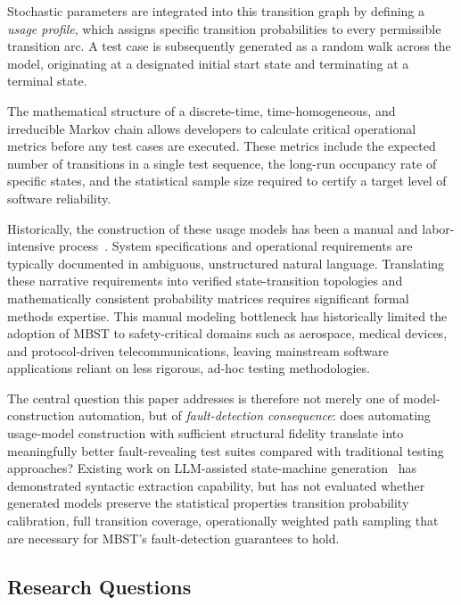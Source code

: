 Stochastic parameters are integrated into this transition graph by defining a \emph{usage profile}, which assigns specific transition probabilities to every permissible transition arc. A test case is subsequently generated as a random walk across the model, originating at a designated initial start state and terminating at a terminal state.

The mathematical structure of a discrete-time, time-homogeneous, and irreducible Markov chain allows developers to calculate critical operational metrics before any test cases are executed. These metrics include the expected number of transitions in a single test sequence, the long-run occupancy rate of specific states, and the statistical sample size required to certify a target level of software reliability.

Historically, the construction of these usage models has been a manual and labor-intensive process~\cite{llm_state_machine_frameworks}. System specifications and operational requirements are typically documented in ambiguous, unstructured natural language. Translating these narrative requirements into verified state-transition topologies and mathematically consistent probability matrices requires significant formal methods expertise. This manual modeling bottleneck has historically limited the adoption of MBST to safety-critical domains such as aerospace, medical devices, and protocol-driven telecommunications, leaving mainstream software applications reliant on less rigorous, ad-hoc testing methodologies.

The central question this paper addresses is therefore not merely one of model-construction automation, but of \emph{fault-detection consequence}: does automating usage-model construction with sufficient structural fidelity translate into meaningfully better fault-revealing test suites compared with traditional testing approaches?  Existing work on LLM-assisted state-machine generation~\cite{llm_state_machine_frameworks} has demonstrated syntactic extraction capability, but has not evaluated whether generated models preserve the statistical properties transition probability calibration, full transition coverage, operationally weighted path sampling that are necessary for MBST's fault-detection guarantees to hold.

\subsection*{Research Questions}
\label{subsec:rqs}

